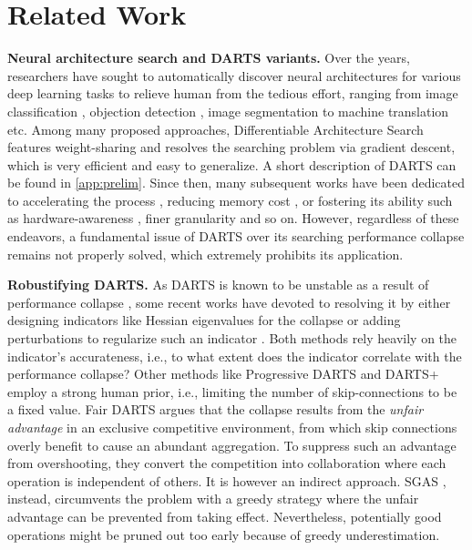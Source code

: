 \documentclass{article} \usepackage{iclr2021_conference,times}
\begin{document}
\section{Related Work}

\textbf{Neural architecture search and DARTS variants.} 
Over the years, researchers have sought to automatically discover neural architectures for various deep learning tasks to relieve human from the tedious effort, ranging from image classification \citep{zoph2017learning}, objection detection \citep{ghiasi2019fpn}, image segmentation \citep{liu2019auto} to machine translation \citep{so2019evolved} etc. Among many proposed approaches, Differentiable Architecture Search \citep{liu2018darts} features weight-sharing and resolves the searching problem via gradient descent, which is very efficient and easy to generalize. A short description of DARTS can be found in \ref{app:prelim}. Since then, many subsequent works have been dedicated to accelerating the process \citep{dong2019searching}, reducing memory cost \citep{xu2020pcdarts}, or fostering its ability such as hardware-awareness \citep{cai2018proxylessnas,wu2018fbnet}, finer granularity \citep{mei2020atomnas} and so on. However, regardless of these endeavors, a fundamental issue of DARTS over its searching performance collapse remains not properly solved, which extremely prohibits its application.


\textbf{Robustifying  DARTS.}  As DARTS \citep{liu2018darts} is known to be unstable as a result of performance collapse \citep{chu2019fair}, some recent works have devoted to resolving it by either designing indicators like Hessian eigenvalues for the collapse \citep{zela2020understanding} or adding perturbations to regularize such an indicator \citep{chen2020stabilizing}. Both methods rely heavily on the indicator's accurateness, i.e., to what extent does the indicator  correlate with the performance collapse? Other methods like Progressive DARTS \citep{chen2019progressive} and DARTS+ \citep{liang2019darts} employ a strong human prior, i.e., limiting the number of skip-connections to be a fixed value. Fair DARTS \citep{chu2019fair} argues that the collapse results from the \emph{unfair advantage} in an exclusive competitive environment, from which skip connections overly benefit to cause an abundant aggregation. To suppress such an advantage from overshooting, they convert the competition into collaboration where each operation is independent of others. It is however an indirect approach. SGAS \citep{li2019sgas}, instead, circumvents the problem with a greedy strategy where the unfair advantage can be prevented from taking effect. Nevertheless, potentially good operations might be pruned out too early because of greedy underestimation.
\end{document}
